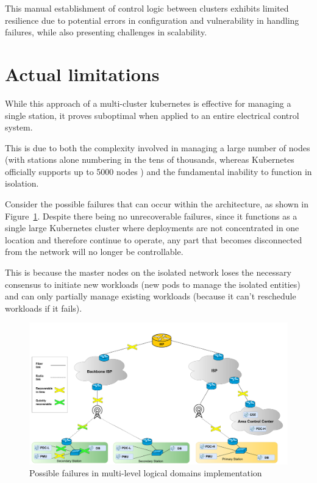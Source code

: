 This manual establishment of control logic between clusters exhibits limited resilience due to potential errors in configuration and vulnerability in handling failures, while also presenting challenges in scalability.

\section{Actual limitations}
While this approach of a multi-cluster kubernetes is effective for managing a single station, it proves suboptimal when applied to an entire electrical control system.

This is due to both the complexity involved in managing a large number of nodes (with stations alone numbering in the tens of thousands, whereas Kubernetes officially supports up to 5000 nodes \cite{a3-1}) and the fundamental inability to function in isolation. 

Consider the possible failures that can occur within the architecture, as shown in Figure~\ref{fig:a-failures}. Despite there being no unrecoverable failures, since it functions as a single large Kubernetes cluster where deployments are not concentrated in one location and therefore continue to operate, any part that becomes disconnected from the network will no longer be controllable. 

This is because the master nodes on the isolated network loses the necessary consensus to initiate new workloads (new pods to manage the isolated entities) and can only partially manage existing workloads (because it can't reschedule workloads if it fails).

\begin{figure}[ht]\centering
\includegraphics[scale=0.20]{Pictures/actual-failures}
\caption{Possible failures in multi-level logical domains implementation}\label{fig:a-failures}
\end{figure}

